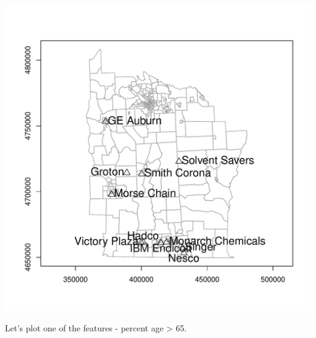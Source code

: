 \documentclass{article}\usepackage[]{graphicx}\usepackage[]{color}
\makeatletter
\def\maxwidth{ %
  \ifdim\Gin@nat@width>\linewidth
    \linewidth
  \else
    \Gin@nat@width
  \fi
}
\newenvironment{kframe}{%
 \def\at@end@of@kframe{}%
 \ifinner\ifhmode%
  \def\at@end@of@kframe{\end{minipage}}%
  \begin{minipage}{\columnwidth}%
 \fi\fi%
 \def\FrameCommand##1{\hskip\@totalleftmargin \hskip-\fboxsep
 \colorbox{shadecolor}{##1}\hskip-\fboxsep
     \hskip-\linewidth \hskip-\@totalleftmargin \hskip\columnwidth}%
 \MakeFramed {\advance\hsize-\width
   \@totalleftmargin\z@ \linewidth\hsize
   \@setminipage}}%
 {\par\unskip\endMakeFramed%
 \at@end@of@kframe}
\newenvironment{knitrout}{}{} %
\makeatother
\begin{document}
\begin{knitrout}
\begin{kframe}
\begin{alltt}
\end{alltt}
\end{kframe}
\includegraphics[width=\maxwidth]{figure/unnamed-chunk-102} 

\end{knitrout}

Let's plot one of the features - percent age > 65.
\end{document}
